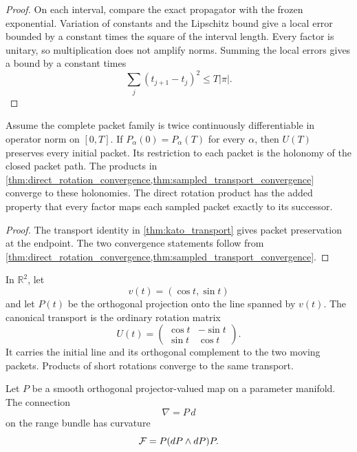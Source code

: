 \begin{proof}
On each interval, compare the exact propagator with the frozen exponential.  Variation of constants and the Lipschitz bound give a local error bounded by a constant times the square of the interval length.  Every factor is unitary, so multiplication does not amplify norms.  Summing the local errors gives a bound by a constant times
\[
\sum_j(t_{j+1}-t_j)^2
\le
T|\pi|.
\]
\end{proof}

\begin{corollary}\label{cor:continuous_holonomy}
Assume the complete packet family is twice continuously differentiable in operator norm on $[0,T]$. If $P_\alpha(0)=P_\alpha(T)$ for every $\alpha$, then $U(T)$ preserves every initial packet.  Its restriction to each packet is the holonomy of the closed packet path.  The products in \cref{thm:direct_rotation_convergence,thm:sampled_transport_convergence} converge to these holonomies.  The direct rotation product has the added property that every factor maps each sampled packet exactly to its successor.
\end{corollary}

\begin{proof}
The transport identity in \cref{thm:kato_transport} gives packet preservation at the endpoint.  The two convergence statements follow from \cref{thm:direct_rotation_convergence,thm:sampled_transport_convergence}.
\end{proof}

\begin{example}\label{ex:rotating_line}
In $\mathbb R^2$, let
\[
v(t)=(\cos t,\sin t)
\]
and let $P(t)$ be the orthogonal projection onto the line spanned by $v(t)$.  The canonical transport is the ordinary rotation matrix
\[
U(t)=
\begin{pmatrix}
\cos t&-\sin t\\
\sin t&\cos t
\end{pmatrix}.
\]
It carries the initial line and its orthogonal complement to the two moving packets.  Products of short rotations converge to the same transport.
\end{example}


\begin{standardfact}\label{fact:projected_curvature}
Let $P$ be a smooth orthogonal projector-valued map on a parameter manifold.  The connection
\[
\nabla=P\,d
\]
on the range bundle has curvature
\[
\mathcal F=P(dP\wedge dP)P.
\]
\end{standardfact}

